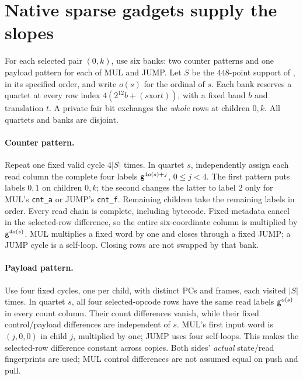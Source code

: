 \documentclass[11pt]{article}
\begin{document}
\section{Native sparse gadgets supply the slopes}

For each selected pair $(0,k)$, use six banks: two counter patterns and one payload pattern for each of MUL and JUMP. Let $S$ be the $448$-point support of , in its specified order, and write $o(s)$ for the ordinal of $s$. Each bank reserves a quartet at every row index $4(2^{12}b+(s\mathbin{\mathrm{xor}}t))$, with a fixed band $b$ and translation $t$. A private fair bit exchanges the \emph{whole} rows at children $0,k$. All quartets and banks are disjoint.

\paragraph{Counter pattern.} Repeat one fixed valid cycle $4|S|$ times. In quartet $s$, independently assign each read column the complete four labels $\mathsf{g}^{4o(s)+j}$, $0\le j<4$. The first pattern puts labels $0,1$ on children $0,k$; the second changes the latter to label $2$ only for MUL's \texttt{cnt\_a} or JUMP's \texttt{cnt\_f}. Remaining children take the remaining labels in order. Every read chain is complete, including bytecode. Fixed metadata cancel in the selected-row difference, so the entire six-coordinate column is multiplied by $\mathsf{g}^{4o(s)}$. MUL multiplies a fixed word by one and closes through a fixed JUMP; a JUMP cycle is a self-loop. Closing rows are not swapped by that bank.

\paragraph{Payload pattern.} Use four fixed cycles, one per child, with distinct PCs and frames, each visited $|S|$ times. In quartet $s$, all four selected-opcode rows have the same read labels $\mathsf{g}^{o(s)}$ in every count column. Their count differences vanish, while their fixed control/payload differences are independent of $s$. MUL's first input word is $(j,0,0)$ in child $j$, multiplied by one; JUMP uses four self-loops. This makes the selected-row difference constant across copies. Both sides' \emph{actual} state/read fingerprints are used; MUL control differences are not assumed equal on push and pull.
\end{document}
